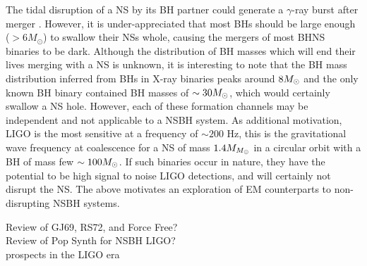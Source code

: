 The tidal disruption of a NS by its BH partner could generate a $\gamma$-ray
burst after merger \citep{NPP:NSBH_GRB:1992}. However, it is under-appreciated
that most BHs should be large enough ($> 6M_\odot $) to swallow their NSs
whole, causing the mergers of most BHNS binaries to be dark. 
Although the distribution of BH masses
which will end their lives merging with a NS is unknown, it is interesting to
note that the BH mass distribution inferred from BHs in X-ray binaries peaks
around $8 {M_{\odot}}$ \citep{Orzel:2008} and the only known BH binary contained BH
masses of $\sim 30 {M_{\odot}}$, which would certainly swallow a NS hole. However,
each of these formation channels may be independent and not applicable to a
NSBH system. As additional motivation, LIGO is the most sensitive at a
frequency of $\sim 200$ Hz, this is the gravitational wave frequency at
coalescence for a NS of mass $1.4 M_{{M_{\odot}}}$ in a circular orbit with a BH of
mass few $\sim100 {M_{\odot}}$. If such binaries occur in nature, they have the
potential to be high signal to noise LIGO detections, and will certainly not
disrupt the NS. The above motivates an exploration of EM counterparts to non-
disrupting NSBH systems.





Review of GJ69, RS72, and Force Free?\\



Review of Pop Synth for NSBH LIGO?\\
prospects in the LIGO era









